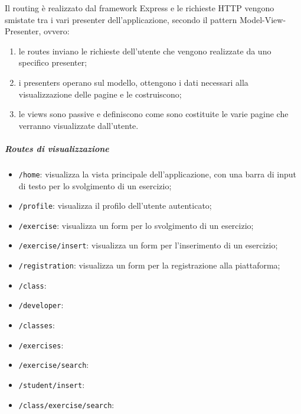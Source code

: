 \noindent Il routing è realizzato dal framework Express e le richieste HTTP vengono smistate tra i vari presenter dell'applicazione, secondo il pattern Model-View-Presenter, ovvero:
\begin{enumerate}
	\item le routes inviano le richieste dell'utente che vengono realizzate da uno specifico presenter;
	\item i presenters operano sul modello, ottengono i dati necessari alla visualizzazione delle pagine e le costruiscono;
	\item le views sono passive e definiscono come sono costituite le varie pagine che verranno visualizzate dall'utente.
\end{enumerate}

\subparagraph*{Routes di visualizzazione}
\begin{itemize}
	\item \texttt{/home}: visualizza la vista principale dell'applicazione, con una barra di input di testo per lo svolgimento di un esercizio;
	\item \texttt{/profile}: visualizza il profilo dell'utente autenticato;
	\item \texttt{/exercise}: visualizza un form per lo svolgimento di un esercizio;
	\item \texttt{/exercise/insert}: visualizza un form per l'inserimento di un esercizio;
	\item \texttt{/registration}: visualizza un form per la registrazione alla piattaforma;
	\item \texttt{/class}:
	\item \texttt{/developer}:
	\item \texttt{/classes}:
	\item \texttt{/exercises}:
	\item \texttt{/exercise/search}:
	\item \texttt{/student/insert}:
	\item \texttt{/class/exercise/search}:
\end{itemize}

